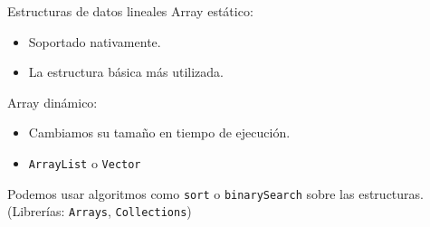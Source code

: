 \documentclass[10pt]{beamer}
\begin{document}
\begin{frame}{Estructuras de datos lineales}
  Array estático:
  \begin{itemize}
  \item Soportado nativamente.
  \item La estructura básica más utilizada.
  \end{itemize}
  Array dinámico:
  \begin{itemize}
  \item Cambiamos su tamaño en tiempo de ejecución.
  \item \texttt{ArrayList} o \texttt{Vector}
  \end{itemize}
  Podemos usar algoritmos como \texttt{sort} o \texttt{binarySearch}
  sobre las estructuras. (Librerías: \texttt{Arrays},
  \texttt{Collections})
\end{frame}
\end{document}
